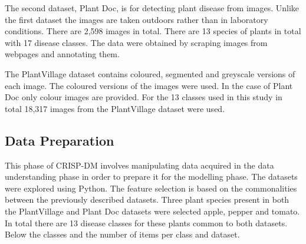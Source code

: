 \documentclass[conference]{IEEEtran}
\begin{document}
The second dataset, Plant Doc, is for detecting plant disease from images. Unlike the first dataset the images are taken outdoors rather than in laboratory conditions. There are 2,598 images in total. There are 13 species of plants in total with 17 disease classes. The data were obtained by scraping images from webpages and annotating them. 

The PlantVillage dataset contains coloured, segmented and greyscale versions of each image. The coloured versions of the images were used. In the case of Plant Doc only colour images are provided. For the 13 classes used in this study in total 18,317 images from the PlantVillage dataset were used. 
\subsection{Data Preparation}
This phase of CRISP-DM involves manipulating data acquired in the data understanding phase in order to prepare it for the modelling phase. The datasets were explored using Python. The feature selection is based on the commonalities between the previously described datasets. Three plant species present in both the PlantVillage and Plant Doc datasets were selected apple, pepper and tomato. In total there are 13 disease classes for these plants common to both datasets. Below the classes and the number of items per class and dataset. 
\end{document}
